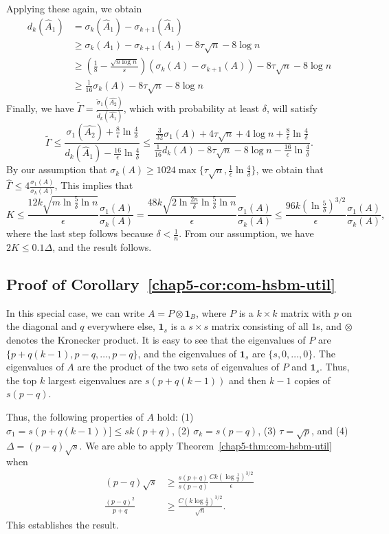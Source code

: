 Applying these again, we obtain
\begin{align*}
    d_k(\hat{A}_1) &= \sigma_{k}(\hat{A}_1) - \sigma_{k+1}(\hat{A}_1) \\
    &\geq \sigma_k(A_1) - \sigma_{k+1}(A_1) - 8\tau \sqrt{n} - 8\log n \\
    &\geq (\frac{1}{8}-\frac{\sqrt{n \log n}}{s})(\sigma_k(A) - \sigma_{k+1}(A)) - 8\tau \sqrt{n} - 8\log n \\
    &\geq \frac{1}{16}\sigma_k(A) - 8\tau \sqrt{n} - 8\log n
\end{align*}
Finally, we have $\tilde{\Gamma} = \frac{\tilde{\sigma}_1(\hat{A_2})}{\tilde{d}_k(\hat{A_1})}$, which with probability at least $\delta$, will satisfy
\[
\tilde{\Gamma} \leq \frac{\sigma_1(\hat{A_2}) + \frac{8}{\epsilon} \ln \frac{4}{\delta} }{d_k(\hat{A}_1) - \frac{16}{\epsilon} \ln \frac{4}{\delta}} \leq 
\frac{\frac{3}{32} \sigma_1(A) + 4\tau \sqrt{n} + 4 \log n + \frac{8}{\epsilon} \ln \frac{4}{\delta} }{\frac{1}{16}d_k(A) - 8\tau \sqrt{n} - 8\log n - \frac{16}{\epsilon} \ln \frac{4}{\delta}}.
\]
By our assumption that $\sigma_k(A) \geq 1024 \max \{\tau \sqrt{n}, \frac{1}{\epsilon} \ln \frac{4}{\delta} \}$, we obtain that $\hat{\Gamma} \leq 4 \frac{\sigma_1(A)}{\sigma_k(A)}$, 
This implies that 
\[
    K \leq \frac{12k \sqrt{m\ln \frac{5}{\delta} \ln n}}{\epsilon} \frac{\sigma_1(A)}{\sigma_k(A)} = \frac{48k \sqrt{2 \ln \frac{2n}{\delta} \ln \frac{5}{\delta} \ln n}}{\epsilon} \frac{\sigma_1(A)}{\sigma_k(A)}
    \leq \frac{96k (\ln \frac{5}{\delta})^{3/2}}{\epsilon} \frac{\sigma_1(A)}{\sigma_k(A)},
\]
where the last step follows because $\delta < \frac{1}{n}$. From our assumption, we have $2K \leq 0.1\Delta$, and the result follows.

\subsection{Proof of Corollary~\ref{chap5-cor:com-hsbm-util}}

In this special case, we can write $A = P \otimes \textbf{1}_B$, where $P$ is a $k \times k$ matrix with $p$ on the diagonal and $q$ everywhere else, $\textbf{1}_s$ is a $s \times s$ matrix consisting of all $1$s, and $\otimes$ denotes the Kronecker product. It is easy to see that the eigenvalues of $P$ are $\{p + q(k-1), p-q, \ldots, p-q\}$, and the eigenvalues of $\textbf{1}_s$ are $\{s, 0, \ldots, 0\}$. The eigenvalues of $A$ are the product of the two sets of eigenvalues of $P$ and $\textbf{1}_s$. Thus, the top $k$ largest eigenvalues are $s(p + q(k-1))$ and then $k-1$ copies of $s(p-q)$.

Thus, the following properties of $A$ hold: (1) $\sigma_1 = s(p + q(k-1)) ] \leq sk (p + q)$, (2) $\sigma_k = s(p-q)$, (3) $\tau = \sqrt{p}$, and (4) $\Delta = (p-q)\sqrt{s}$. We are able to apply Theorem~\ref{chap5-thm:com-hsbm-util} when 
\begin{align*}
    (p-q) \sqrt{s} &\geq \frac{s(p+q)}{s(p-q)} \frac{Ck(\log \frac{1}{\delta})^{3/2}}{\epsilon} \\
    \frac{(p-q)^2}{p+q} &\geq \frac{C(k\log \frac{1}{\delta})^{3/2}}{\sqrt{n}}.
\end{align*}
This establishes the result.
